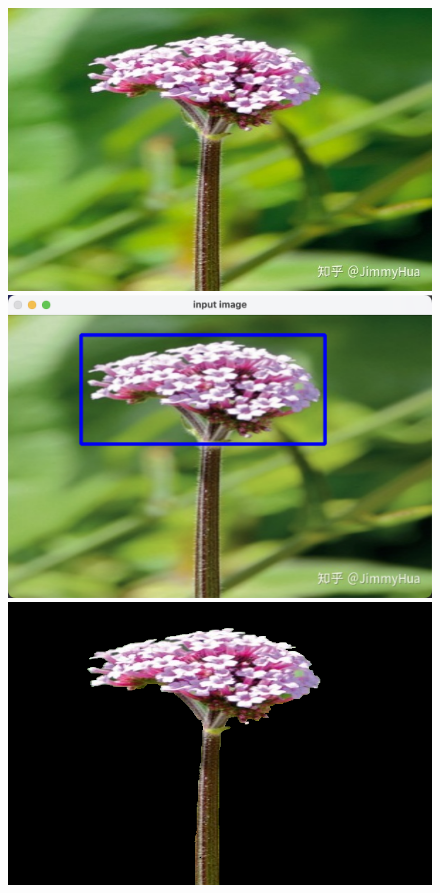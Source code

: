 \documentclass[lang=cn,11pt,a4paper]{elegantpaper}
\begin{document}
\begin{figure}[ht]
	\begin{minipage}{0.3\linewidth}
		\centering
		\includegraphics[width=0.95\linewidth]{image/flower.jpeg}
	\end{minipage}
	\begin{minipage}{0.3\linewidth}
		\centering
		\includegraphics[width=0.9\linewidth]{image/flower_graffiti.png}
	\end{minipage}
	\begin{minipage}{0.3\linewidth}
		\centering
		\includegraphics[width=0.9\linewidth]{image/result_flower_.png}
	\end{minipage}%
	

\end{figure}
\end{document}
